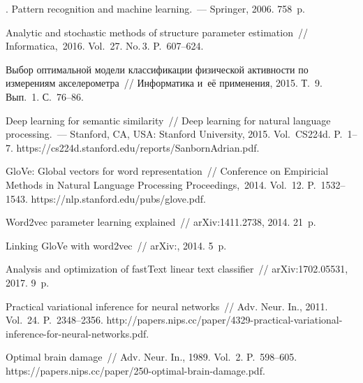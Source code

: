 \begin{multicols}{2}
{{\begin{thebibliography}{99}
    . Pattern recognition and machine learning.~--- 
Springer, 2006. 758~p.
    
     Analytic and 
stochastic methods of structure parameter estimation~// Informatica,~2016. 
Vol.~27. No.\,3. P.~607--624.
    
     Выбор оптимальной модели 
классификации физической активности по измерениям акселерометра~// Информатика 
и~её применения, 2015. Т.~9. Вып.~1. С.~76--86.
    
    Deep learning for semantic similarity~// Deep learning for natural 
language processing.~--- Stanford, CA, USA: Stanford University, 2015. 
Vol.~CS224d. P.~1--7. {\sf 
https://cs224d.stanford.\linebreak edu/reports/SanbornAdrian.pdf}.

     GloVe: Global vectors 
for word representation~// Conference on Empiricial Methods in Natural 
Language Processing Proceedings,~2014. Vol.~12.  P.~1532--1543. {\sf
https://nlp.\linebreak stanford.edu/pubs/glove.pdf}.
        
     Word2vec parameter learning explained~//
    \mbox{arXiv}:1411.2738, 2014. 21~p.
    
     Linking GloVe with word2vec~// \mbox{arXiv}:, 2014. 5~p.
    
      Analysis and optimization of fastText linear 
text classifier~// arXiv:1702.05531, 2017. 9~p.
    
    Practical variational inference for neural networks~// Adv. Neur. 
In., 2011. Vol.~24. P.~2348--2356. {\sf
http://papers.nips.cc/paper/4329-practical-variational-inference-for-neural-networks.pdf}.
    
     Optimal brain damage~// 
Adv. Neur. In., 1989. Vol.~2. P.~598--605. 
{\sf https://papers.nips.cc/paper/250-optimal-brain-\linebreak damage.pdf}.
    

\end{thebibliography}}}
\end{multicols}
